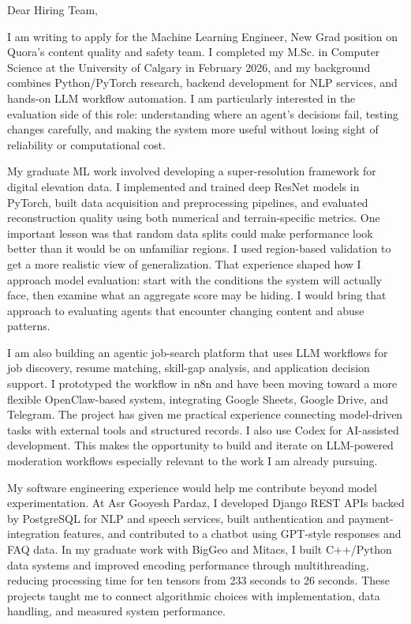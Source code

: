 \documentclass[11pt]{letter}
\begin{document}
\begin{letter}{}
\opening{Dear Hiring Team,}

I am writing to apply for the Machine Learning Engineer, New Grad position on Quora's content quality and safety team. I completed my M.Sc. in Computer Science at the University of Calgary in February 2026, and my background combines Python/PyTorch research, backend development for NLP services, and hands-on LLM workflow automation. I am particularly interested in the evaluation side of this role: understanding where an agent's decisions fail, testing changes carefully, and making the system more useful without losing sight of reliability or computational cost.

My graduate ML work involved developing a super-resolution framework for digital elevation data. I implemented and trained deep ResNet models in PyTorch, built data acquisition and preprocessing pipelines, and evaluated reconstruction quality using both numerical and terrain-specific metrics. One important lesson was that random data splits could make performance look better than it would be on unfamiliar regions. I used region-based validation to get a more realistic view of generalization. That experience shaped how I approach model evaluation: start with the conditions the system will actually face, then examine what an aggregate score may be hiding. I would bring that approach to evaluating agents that encounter changing content and abuse patterns.

I am also building an agentic job-search platform that uses LLM workflows for job discovery, resume matching, skill-gap analysis, and application decision support. I prototyped the workflow in n8n and have been moving toward a more flexible OpenClaw-based system, integrating Google Sheets, Google Drive, and Telegram. The project has given me practical experience connecting model-driven tasks with external tools and structured records. I also use Codex for AI-assisted development. This makes the opportunity to build and iterate on LLM-powered moderation workflows especially relevant to the work I am already pursuing.

My software engineering experience would help me contribute beyond model experimentation. At Asr Gooyesh Pardaz, I developed Django REST APIs backed by PostgreSQL for NLP and speech services, built authentication and payment-integration features, and contributed to a chatbot using GPT-style responses and FAQ data. In my graduate work with BigGeo and Mitacs, I built C++/Python data systems and improved encoding performance through multithreading, reducing processing time for ten tensors from 233 seconds to 26 seconds. These projects taught me to connect algorithmic choices with implementation, data handling, and measured system performance.


\end{letter}
\end{document}

